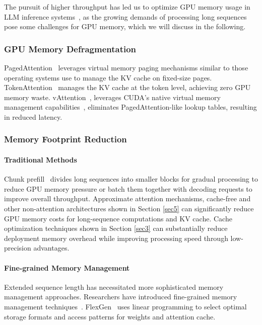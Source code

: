 The pursuit of higher throughput has led us to optimize GPU memory usage in LLM inference systems~\citep{semianalysis2023BlackwellInferenceTraining, kwon2023efficient, zheng2024sglang}, as the growing demands of processing long sequences pose some challenges for GPU memory, which we will discuss in the following.

\subsubsection{GPU Memory Defragmentation}

PagedAttention~\citep{kwon2023efficient} leverages virtual memory paging mechanisms similar to those operating systems use to manage the KV cache on fixed-size pages. TokenAttention~\citep{LightLLM2024token_attention, hu2024lightllm} manages the KV cache at the token level, achieving zero GPU memory waste. vAttention~\citep{prabhu2024vattention, xu2024vtensor}, leverages CUDA's native virtual memory management capabilities~\citep{CUDA2020virtual}, eliminates PagedAttention-like lookup tables, resulting in reduced latency.

\subsubsection{Memory Footprint Reduction}

\paragraph{Traditional Methods}
Chunk prefill~\citep{agrawal2024taming, holmes2024deepspeed, zeng2024memorize} divides long sequences into smaller blocks for gradual processing to reduce GPU memory pressure or batch them together with decoding requests to improve overall throughput. Approximate attention mechanisms, cache-free and other non-attention architectures shown in Section \ref{sec5} can significantly reduce GPU memory costs for long-sequence computations and KV cache. Cache optimization techniques shown in Section \ref{sec3} can substantially reduce deployment memory overhead while improving processing speed through low-precision advantages.

\paragraph{Fine-grained Memory Management}
Extended sequence length has necessitated more sophisticated memory management approaches. Researchers have introduced fine-grained memory management techniques~\citep{sheng2023flexgen, he2024fastdecode, jiang2024neo, gao2024attentionstore, lee2024infinigen}. FlexGen~\citep{sheng2023flexgen} uses linear programming to select optimal storage formats and access patterns for weights and attention cache. 

